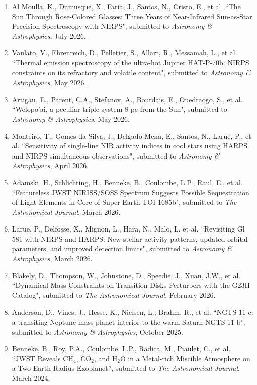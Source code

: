 \documentclass[12pt]{article}
\begin{document}
\begin{itemize}
\begin{enumerate}
\item Al Moulla, K., Dumusque, X., Faria, J., Santos, N., Cristo, E., et al. ``The Sun Through Rose-Colored Glasses: Three Years of Near-Infrared Sun-as-Star Precision Spectroscopy with NIRPS", submitted to {\it Astronomy \& Astrophysics}, July 2026.
\item Vaulato, V., Ehrenreich, D., Pelletier, S., Allart, R., Messamah, L., et al. ``Thermal emission spectroscopy of the ultra-hot Jupiter HAT-P-70b: NIRPS constraints on its refractory and volatile content", submitted to {\it Astronomy \& Astrophysics}, May 2026.
\item Artigau, E., Parent, C.A., Stefanov, A., Bourdais, E., Ouedraogo, S., et al. ``Welopo'ai, a peculiar triple system 8 pc from the Sun", submitted to {\it Astronomy \& Astrophysics}, May 2026.
\item Monteiro, T., Gomes da Silva, J., Delgado-Mena, E., Santos, N., Larue, P., et al. ``Sensitivity of single-line NIR activity indices in cool stars using HARPS and NIRPS simultaneous observations", submitted to {\it Astronomy \& Astrophysics}, April 2026.
\item Adamski, H., Schlichting, H., Benneke, B., Coulombe, L.P., Raul, E., et al. ``Featureless JWST NIRISS/SOSS Spectrum Suggests Possible Sequestration of Light Elements in Core of Super-Earth TOI-1685b", submitted to {\it The Astronomical Journal}, March 2026.
\item Larue, P., Delfosse, X., Mignon, L., Hara, N., Malo, L. et al. ``Revisiting Gl 581 with NIRPS and HARPS: New stellar activity patterns, updated orbital parameters, and improved detection limits", submitted to {\it Astronomy \& Astrophysics}, March 2026.
\item Blakely, D., Thompson, W., Johnstone, D., Speedie, J., Xuan, J.W., et al. ``Dynamical Mass Constraints on Transition Disks Perturbers with the G23H Catalog", submitted to {\it The Astronomical Journal}, February 2026.
\item Anderson, D., Vines, J., Hesse, K., Nielsen, L., Brahm, R., et al. ``NGTS-11 c: a transiting Neptune-mass planet interior to the warm Saturn NGTS-11 b'', submitted to {\it Astronomy \& Astrophysics}, October 2025.
\item Benneke, B., Roy, P.A., Coulombe, L.P., Radica, M., Piaulet, C., et al. ``JWST Reveals CH$_4$, CO$_2$, and H$_2$O in a Metal-rich Miscible Atmosphere on a Two-Earth-Radius Exoplanet'', submitted to {\it The Astronomical Journal}, March 2024.
\end{enumerate}


\end{itemize}
\end{document}

